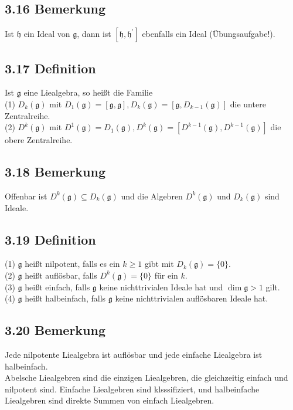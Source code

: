 \documentclass[10pt, letterpaper]{article}
\begin{document}
\subsection*{3.16 Bemerkung}
Ist $\mathfrak{h}$ ein Ideal von $\mathfrak{g}$, dann ist $\left[\mathfrak{h}, \mathfrak{h}^{\prime}\right]$ ebenfalls ein Ideal (Übungsaufgabe!).

\subsection*{3.17 Definition}
Ist $\mathfrak{g}$ eine Liealgebra, so heißt die Familie\\
(1) $D_{k}(\mathfrak{g})$ mit $D_{1}(\mathfrak{g})=[\mathfrak{g}, \mathfrak{g}], D_{k}(\mathfrak{g})=\left[\mathfrak{g}, D_{k-1}(\mathfrak{g})\right]$ die untere Zentralreihe.\\
(2) $D^{k}(\mathfrak{g})$ mit $D^{1}(\mathfrak{g})=D_{1}(\mathfrak{g}), D^{k}(\mathfrak{g})=\left[D^{k-1}(\mathfrak{g}), D^{k-1}(\mathfrak{g})\right]$ die obere Zentralreihe.

\subsection*{3.18 Bemerkung}
Offenbar ist $D^{k}(\mathfrak{g}) \subseteq D_{k}(\mathfrak{g})$ und die Algebren $D^{k}(\mathfrak{g})$ und $D_{k}(\mathfrak{g})$ sind Ideale.

\subsection*{3.19 Definition}
(1) $\mathfrak{g}$ heißt nilpotent, falls es ein $k \geq 1$ gibt mit $D_{k}(\mathfrak{g})=\{0\}$.\\
(2) $\mathfrak{g}$ heißt auflösbar, falls $D^{k}(\mathfrak{g})=\{0\}$ für ein $k$.\\
(3) $\mathfrak{g}$ heißt einfach, falls $\mathfrak{g}$ keine nichttrivialen Ideale hat und $\operatorname{dim} \mathfrak{g}>1$ gilt.\\
(4) $\mathfrak{g}$ heißt halbeinfach, falls $\mathfrak{g}$ keine nichttrivialen auflösbaren Ideale hat.

\subsection*{3.20 Bemerkung}
Jede nilpotente Liealgebra ist auflösbar und jede einfache Liealgebra ist halbeinfach.\\
Abelsche Liealgebren sind die einzigen Liealgebren, die gleichzeitig einfach und nilpotent sind. Einfache Liealgebren sind klsssifiziert, und halbeinfache Liealgebren sind direkte Summen von einfach Liealgebren.
\end{document}
